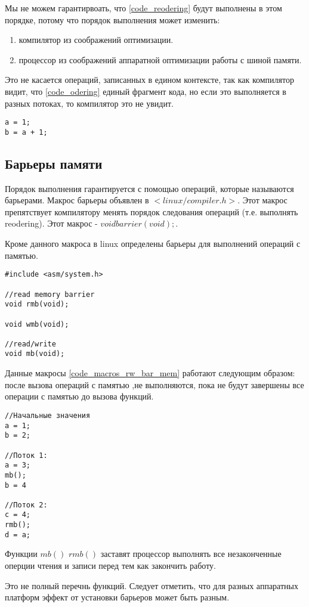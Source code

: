 Мы не можем гарантирвоать, что \ref{code_reodering} будут выполнены в этом порядке, потому что порядок выполнения может изменить:
\begin{enumerate}
	\item компилятор из соображений оптимизации.
	\item процессор из соображений аппаратной оптимизации работы с шиной памяти.
\end{enumerate}

Это не касается операций, записанных в едином контексте, так как компилятор видит, что \ref{code_odering}  единый фрагмент кода, но если это выполняется в разных потоках, то компилятор это не увидит.

\begin{lstlisting}[caption=listing, label=code_odering]
a = 1;
b = a + 1;
\end{lstlisting}

\subsection{Барьеры памяти}
Порядок выполнения гарантируется с помощью операций, которые называются барьерами. Макрос барьеры объявлен в $<linux/compiler.h>$. Этот макрос препятствует компилятору менять порядок следования операций (т.е. выполнять reodering). Этот макрос - $void barrier(void);$. 

Кроме данного макроса в linux определены барьеры для выполнений операций с памятью.
\begin{lstlisting}[caption=listing, label=code_macros_rw_bar_mem]
#include <asm/system.h> 

//read memory barrier
void rmb(void);

void wmb(void);

//read/write
void mb(void);
\end{lstlisting}

Данные макросы \ref{code_macros_rw_bar_mem} работают следующим образом: после вызова операций с памятью ,не выполняются, пока не будут завершены все операции с памятью до вызова функций.

\begin{lstlisting}
//Начальные значения
a = 1;
b = 2;

//Поток 1:
a = 3;
mb();
b = 4

//Поток 2:
с = 4;
rmb();
d = a;
\end{lstlisting}

Функции $mb()$ $rmb()$ заставят процессор выполнять все незаконченные оперции чтения и записи перед тем как закончить работу.

Это не полный перечнь функций. Следует отметить, что для разных аппаратных платформ эффект от установки барьеров может быть разным.